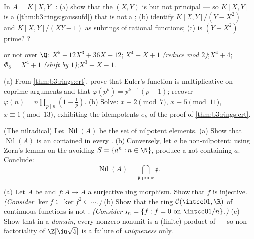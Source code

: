 \begin{exercise}[$\star\star$]\label{exo:b3:rings:6}
In $A = K[X, Y]$: (a) show that the  $(X, Y)$ is  but
not principal --- so $K[X,Y]$ is a 
(\cref{thm:b3:rings:gaussufd}) that is not a ; (b) identify
$K[X, Y]/(Y - X^2)$ and $K[X,Y]/(XY - 1)$ as subrings of rational
functions; (c) is $(Y - X^2)$ prime? ?
\end{exercise}

\begin{exercise}[$\star\star$]\label{exo:b3:rings:7}
 or not over $\Q$: $X^5 - 12X^3 + 36X - 12$;\quad
$X^4 + X + 1$ \emph{(reduce mod $2$)};\quad $X^4 + 4$;\quad
$\Phi_8 = X^4 + 1$ \emph{(shift by $1$)};\quad $X^3 - X - 1$.
\end{exercise}

\begin{exercise}[$\star\star$]\label{exo:b3:rings:8}
(a) From \cref{thm:b3:rings:crt}, prove that Euler's function is
multiplicative on coprime arguments and that $\varphi(p^k) =
p^{k-1}(p-1)$; recover $\varphi(n) = n\prod_{p \mid n}(1 -
\frac1p)$.
(b) Solve: $x \equiv 2 \pmod 7$, $x \equiv 5 \pmod{11}$, $x
\equiv 1 \pmod{13}$, exhibiting the idempotents $e_k$ of the
proof of \cref{thm:b3:rings:crt}.
\end{exercise}

\begin{exercise}[$\star\star\star$]\label{exo:b3:rings:9}
(The nilradical) Let $\operatorname{Nil}(A)$ be the set of
nilpotent elements. (a) Show that $\operatorname{Nil}(A)$ is an
 contained in every . (b) Conversely, let $a$ be
non-nilpotent; using Zorn's lemma on the  avoiding $S =
\{a^n : n \in \N\}$, produce a  not containing $a$.
Conclude:
\[
\operatorname{Nil}(A) = \bigcap_{\mathfrak p \text{ prime}}
\mathfrak p .
\]
\end{exercise}

\begin{exercise}[$\star\star\star$]\label{exo:b3:rings:10}
(a) Let $A$ be  and $f \colon A \to A$ a surjective
ring morphism. Show that $f$ is injective. \emph{(Consider $\ker
f \subseteq \ker f^2 \subseteq \cdots$.)}
(b) Show that the ring $\mathcal C(\intcc01, \R)$ of continuous
functions is not . \emph{(Consider $I_n = \{f : f = 0
\text{ on } \intcc0{1/n}\}$.)}
(c) Show that in a  \emph{domain}, every nonzero
nonunit is a (finite) product of  --- so
non-factoriality of $\Z[\iu\sqrt 5]$ is a failure of
\emph{uniqueness} only.
\end{exercise}

